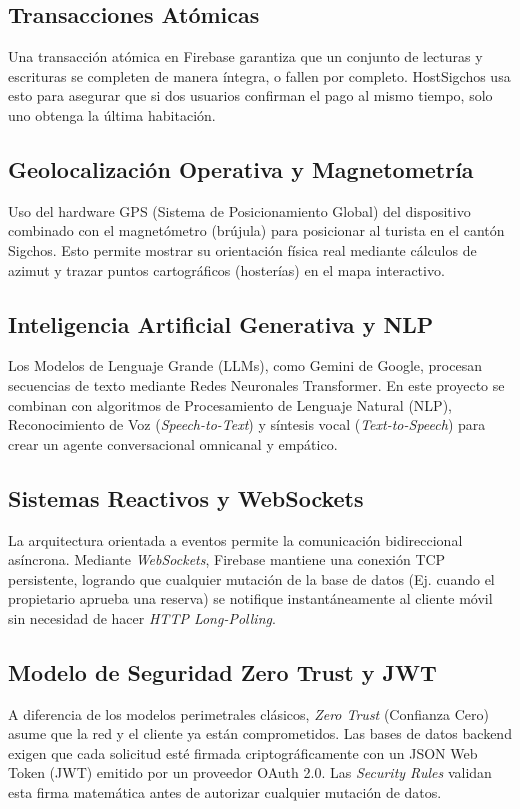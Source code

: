 \documentclass[12pt,letterpaper]{report}
\begin{document}
\subsection{Transacciones Atómicas}
Una transacción atómica en Firebase garantiza que un conjunto de lecturas y escrituras se completen de manera íntegra, o fallen por completo. HostSigchos usa esto para asegurar que si dos usuarios confirman el pago al mismo tiempo, solo uno obtenga la última habitación.

\subsection{Geolocalización Operativa y Magnetometría}
Uso del hardware GPS (Sistema de Posicionamiento Global) del dispositivo combinado con el magnetómetro (brújula) para posicionar al turista en el cantón Sigchos. Esto permite mostrar su orientación física real mediante cálculos de azimut y trazar puntos cartográficos (hosterías) en el mapa interactivo.

\subsection{Inteligencia Artificial Generativa y NLP}
Los Modelos de Lenguaje Grande (LLMs), como Gemini de Google, procesan secuencias de texto mediante Redes Neuronales Transformer. En este proyecto se combinan con algoritmos de Procesamiento de Lenguaje Natural (NLP), Reconocimiento de Voz (\textit{Speech-to-Text}) y síntesis vocal (\textit{Text-to-Speech}) para crear un agente conversacional omnicanal y empático.

\subsection{Sistemas Reactivos y WebSockets}
La arquitectura orientada a eventos permite la comunicación bidireccional asíncrona. Mediante \textit{WebSockets}, Firebase mantiene una conexión TCP persistente, logrando que cualquier mutación de la base de datos (Ej. cuando el propietario aprueba una reserva) se notifique instantáneamente al cliente móvil sin necesidad de hacer \textit{HTTP Long-Polling}.

\subsection{Modelo de Seguridad Zero Trust y JWT}
A diferencia de los modelos perimetrales clásicos, \textit{Zero Trust} (Confianza Cero) asume que la red y el cliente ya están comprometidos. Las bases de datos backend exigen que cada solicitud esté firmada criptográficamente con un JSON Web Token (JWT) emitido por un proveedor OAuth 2.0. Las \textit{Security Rules} validan esta firma matemática antes de autorizar cualquier mutación de datos.
\end{document}
